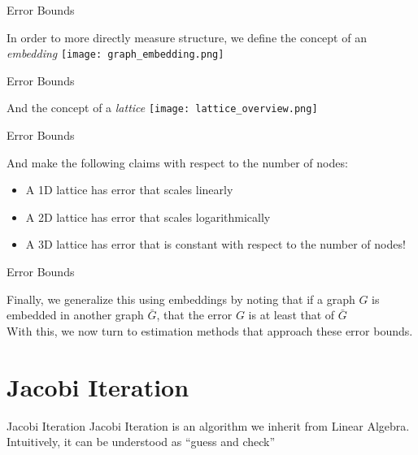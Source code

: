 \documentclass{beamer}
\begin{document}
\begin{frame}{Error Bounds}
\begin{center}
In order to more directly measure structure, we define the concept of an
\emph{embedding}
\texttt{[image: graph\_embedding.png]}
\end{center}
\end{frame}

\begin{frame}{Error Bounds}
\begin{center}
And the concept of a \emph{lattice}
\texttt{[image: lattice\_overview.png]}
\end{center}
\end{frame}

\begin{frame}{Error Bounds}
\begin{center}
And make the following claims with respect to the number of nodes:
\begin{itemize}
\item<1-> A 1D lattice has error that scales linearly
\item<2-> A 2D lattice has error that scales logarithmically 
\item<3-> A 3D lattice has error that is constant with respect to the number of
nodes!
\end{itemize}
\end{center}
\end{frame}

\begin{frame}{Error Bounds}
\begin{center}
Finally, we generalize this using embeddings by noting that if a graph $G$ is
embedded in another graph $\bar{G}$, that the error $G$ is at least that of
$\bar{G}$
\pause
\vspace{5mm}
\\
With this, we now turn to estimation methods that approach these error bounds.
\end{center}
\end{frame}

\section{Jacobi Iteration}
\begin{frame}{Jacobi Iteration}
Jacobi Iteration is an algorithm we inherit from Linear Algebra. 
\pause
\vspace{5mm}
\\
Intuitively, it
can be understood as ``guess and check''
\end{frame}
\end{document}
